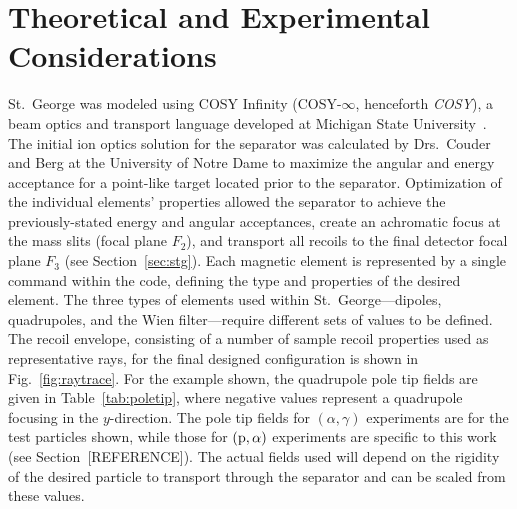 \section{Theoretical and Experimental Considerations}
\label{sec:cosy}


St.\ George was modeled using COSY Infinity (COSY-$\infty$, henceforth
\emph{COSY}), a beam optics and transport language developed at Michigan State
University~\cite{COSY}. The initial ion optics solution for the separator was
calculated by
Drs.\ Couder and Berg at the University of Notre Dame to maximize the angular
and energy acceptance for a point-like target located prior to the separator.
Optimization of the individual elements' properties allowed the separator
to achieve the previously-stated energy and angular acceptances, create an
achromatic focus at the mass slits (focal plane $F_2$), and transport all
recoils to the final detector focal plane $F_3$ (see Section~\ref{sec:stg}).
Each magnetic element is represented by a single command within the code,
defining the type and properties of the desired element. The three types of
elements used within St.\ George\----{}dipoles, quadrupoles, and the Wien
filter\----{}require different sets of values to be defined. The recoil
envelope, consisting of a number of sample recoil properties used as
representative rays, for the final designed configuration is shown in
Fig.~\ref{fig:raytrace}. For the example shown, the quadrupole pole tip fields
are given in
Table~\ref{tab:poletip}, where negative values represent a quadrupole focusing
in the $y$-direction. The pole tip fields for $(\alpha,\gamma)$ experiments are
for the test particles shown, while those for $({\rm p},\alpha)$ experiments
are specific to this work (see Section~[REFERENCE]). The actual fields used
will depend on the rigidity of the desired particle to transport through the
separator and can be scaled from these values.

